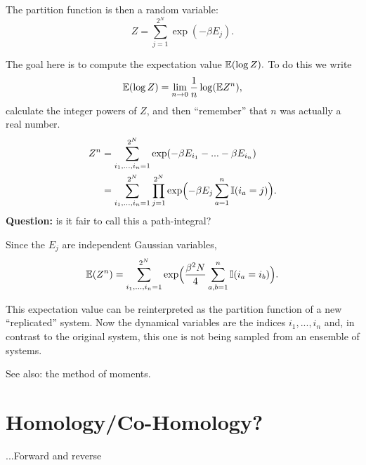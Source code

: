 \documentclass[11pt]{article}
\begin{document}
The partition function is then a random variable:
$$
    Z = \sum_{j=1}^{2^N} \exp(-\beta E_j).
$$

The goal here is to compute the expectation value $\mathbb E(\log Z).$
To do this we write
$$
    \mathbb E(\log Z) = \lim_{n\to 0} \frac{1}{n} \log(\mathbb E Z^n),
$$
calculate the integer powers of $Z$, and then ``remember'' that
$n$ was actually a real number.
\begin{align*}
    Z^n &= \sum_{i_1,...,i_n=1}^{2^N} \exp(-\beta E_{i_1} - ... -\beta E_{i_n})\\
        &= \sum_{i_1,...,i_n=1}^{2^N} \prod_{j=1}^{2^N} \exp\Bigl(-\beta E_j \sum_{a=1}^n \mathbb I(i_a=j)\Bigr).
\end{align*}
{\bf Question:} is it fair to call this a path-integral?

Since the $E_j$ are independent Gaussian variables,
$$
    \mathbb E(Z^n) = \sum_{i_1,...,i_n=1}^{2^N} \exp\Bigl(\frac{\beta^2N}{4} \sum_{a,b=1}^n \mathbb I(i_a=i_b)\Bigr).
$$

This expectation value can be reinterpreted as the partition
function of a new ``replicated'' system. Now the dynamical variables
are the indices $i_1,...,i_n$ and, in contrast to the original system,
this one is not being sampled from an ensemble of systems.

See also: the method of moments.

\section{Homology/Co-Homology?}

...Forward and reverse









\end{document}
